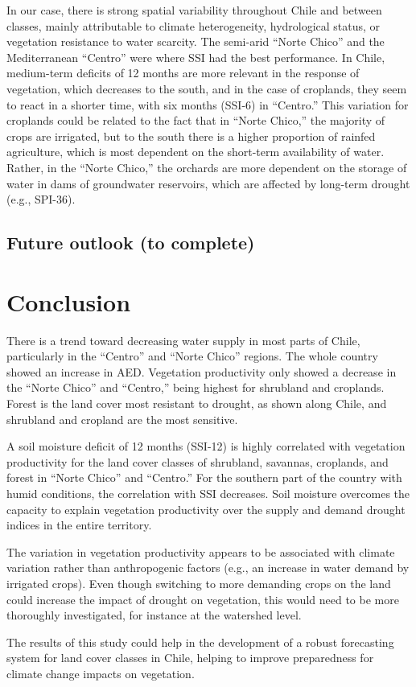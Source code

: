 \documentclass[
  authoryear,
  preprint,
  3p,
  onecolumn]{elsarticle}
\begin{document}
In our case, there is strong spatial variability throughout Chile and
between classes, mainly attributable to climate heterogeneity,
hydrological status, or vegetation resistance to water scarcity. The
semi-arid ``Norte Chico'' and the Mediterranean ``Centro'' were where
SSI had the best performance. In Chile, medium-term deficits of 12
months are more relevant in the response of vegetation, which decreases
to the south, and in the case of croplands, they seem to react in a
shorter time, with six months (SSI-6) in ``Centro.'' This variation for
croplands could be related to the fact that in ``Norte Chico,'' the
majority of crops are irrigated, but to the south there is a higher
proportion of rainfed agriculture, which is most dependent on the
short-term availability of water. Rather, in the ``Norte Chico,'' the
orchards are more dependent on the storage of water in dams of
groundwater reservoirs, which are affected by long-term drought (e.g.,
SPI-36).

\hypertarget{future-outlook-to-complete}{%
\subsection{Future outlook (to
complete)}\label{future-outlook-to-complete}}

\hypertarget{conclusion}{%
\section{Conclusion}\label{conclusion}}

There is a trend toward decreasing water supply in most parts of Chile,
particularly in the ``Centro'' and ``Norte Chico'' regions. The whole
country showed an increase in AED. Vegetation productivity only showed a
decrease in the ``Norte Chico'' and ``Centro,'' being highest for
shrubland and croplands. Forest is the land cover most resistant to
drought, as shown along Chile, and shrubland and cropland are the most
sensitive.

A soil moisture deficit of 12 months (SSI-12) is highly correlated with
vegetation productivity for the land cover classes of shrubland,
savannas, croplands, and forest in ``Norte Chico'' and ``Centro.'' For
the southern part of the country with humid conditions, the correlation
with SSI decreases. Soil moisture overcomes the capacity to explain
vegetation productivity over the supply and demand drought indices in
the entire territory.

The variation in vegetation productivity appears to be associated with
climate variation rather than anthropogenic factors (e.g., an increase
in water demand by irrigated crops). Even though switching to more
demanding crops on the land could increase the impact of drought on
vegetation, this would need to be more thoroughly investigated, for
instance at the watershed level.

The results of this study could help in the development of a robust
forecasting system for land cover classes in Chile, helping to improve
preparedness for climate change impacts on vegetation.


\renewcommand\refname{References}
  
\end{document}
